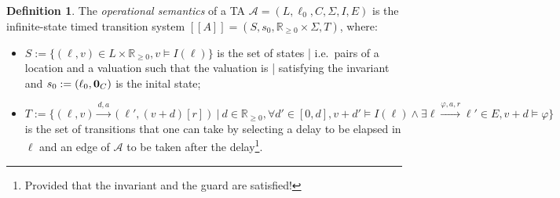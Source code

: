 \documentclass[11pt]{article}
\theoremstyle{definition}
\newtheorem{definition}{Definition}
\theoremstyle{remark}
\begin{document}
\begin{definition}
	The \emph{operational semantics} of a TA $\mathcal{A} = (L, \ell_0, C, \Sigma, I, E)$ is the infinite-state timed transition system $[\![A]\!] = (S, s_0, \mathbb{R}_{\geq 0} \times \Sigma, T)$, where:
	\begin{itemize}
		\item $S := \{(\ell, v) \in L \times \mathbb{R}_{\geq 0}, v \models I(\ell)\}$ is the set of states | i.e.\ pairs of a location and a valuation such that the valuation is | satisfying the invariant and $s_0 := (\ell_0, \text{\bf 0}_C)$ is the inital state;
		\item $T := \{(\ell, v) \xrightarrow{d, a} (\ell', (v+d)[r]) \ | \ d \in \mathbb{R}_{\geq 0}, \forall d' \in [0, d], v + d' \models I(\ell) \land \exists \ell \xrightarrow{\varphi, a, r} \ell' \in E, v + d \models \varphi \}$ is the set of transitions that one can take by selecting a delay to be elapsed in $\ell$ and an edge of $\mathcal{A}$ to be taken after the delay\footnote{Provided that the invariant and the guard are satisfied!}.
	\end{itemize}
\end{definition}




\end{document}
